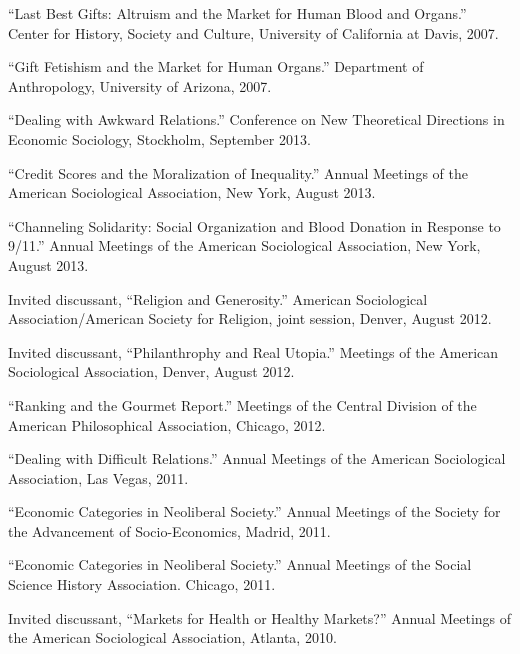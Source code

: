 \documentclass[11pt,article,oneside]{memoir}
\begin{document}
\ind ``Last Best Gifts: Altruism and the Market for Human Blood and Organs.'' Center for History, Society and Culture, University of California at Davis, 2007. 

\ind ``Gift Fetishism and the Market for Human Organs.'' Department of Anthropology, University of Arizona, 2007. 


\bigskip


\medskip

\ind ``Dealing with Awkward Relations.'' Conference on New Theoretical Directions in Economic Sociology, Stockholm, September 2013. 

\ind ``Credit Scores and the Moralization of Inequality.'' Annual Meetings of the American Sociological Association, New York, August 2013.
 
\ind ``Channeling Solidarity: Social Organization and Blood Donation in Response to 9/11.'' Annual Meetings of the American Sociological Association, New York, August 2013.

\ind Invited discussant, ``Religion and Generosity.'' American Sociological Association/American Society for Religion, joint session, Denver, August 2012.

\ind Invited discussant, ``Philanthrophy and Real Utopia.'' Meetings of the American Sociological Association, Denver, August 2012. 

\ind ``Ranking and the Gourmet Report.'' Meetings of the Central Division of the American Philosophical Association, Chicago, 2012. 

\ind ``Dealing with Difficult Relations.'' Annual Meetings of the American Sociological Association, Las Vegas, 2011.

\ind ``Economic Categories in Neoliberal Society.'' Annual Meetings of the Society for the Advancement of Socio-Economics, Madrid, 2011.

\ind ``Economic Categories in Neoliberal Society.'' Annual Meetings of the Social Science History Association. Chicago, 2011. 

\ind Invited discussant, ``Markets for Health or Healthy Markets?'' Annual Meetings of the American Sociological Association, Atlanta, 2010. 
\end{document}
